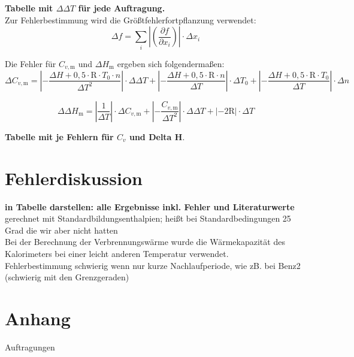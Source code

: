 \documentclass[12pt,a4paper,titlepage,headinclude,bibtotoc]{scrartcl}
\begin{document}
\textbf{Tabelle mit $\Delta \Delta T$ für jede Auftragung.}\\

Zur Fehlerbestimmung wird die Größtfehlerfortpflanzung verwendet:\\

\begin{equation}
\Delta f=\sum_i \left| \left(\frac{\partial f}{\partial x_i}\right)\right| \cdot \Delta x_i
\end{equation}

Die Fehler für $C_{v,\mathrm{m}}$ und $\Delta H_\mathrm{m}$ ergeben sich folgendermaßen:\\

\begin{equation}
\Delta C_{v,\mathrm{m}}= \left|-\frac{\Delta H+0,5 \cdot \mathrm{R}\cdot T_0 \cdot n}{\Delta T^2}\right|\cdot \Delta \Delta T + \left|-\frac{\Delta H+0,5 \cdot \mathrm{R} \cdot n}{\Delta T}\right| \cdot \Delta T_0+ \left|-\frac{\Delta H+0,5 \cdot \mathrm{R}\cdot T_0}{\Delta T}\right|\cdot \Delta n
\end{equation}

\begin{equation}
\Delta \Delta H_\mathrm{m}= \left|\frac{1}{\Delta T}\right| \cdot \Delta C_{v,\mathrm{m}}+ \left|-\frac{C_{v,\mathrm{m}}}{\Delta T^2}\right|\cdot \Delta \Delta T+\left|-2\mathrm{R}\right| \cdot \Delta T
\end{equation}

\textbf{Tabelle mit je Fehlern für $C_v$ und Delta H}.\\

\section{Fehlerdiskussion}
\textbf{in Tabelle darstellen: alle Ergebnisse inkl. Fehler und Literaturwerte}\\

gerechnet mit Standardbildungsenthalpien; heißt bei Standardbedingungen 25 Grad die wir aber nicht hatten\\

Bei der Berechnung der Verbrennungswärme wurde die Wärmekapazität des Kalorimeters bei einer leicht anderen Temperatur verwendet.\\

Fehlerbestimmung schwierig wenn nur kurze Nachlaufperiode, wie zB. bei Benz2 (schwierig mit den Grenzgeraden)

\section{Anhang}
Auftragungen
\end{document}
